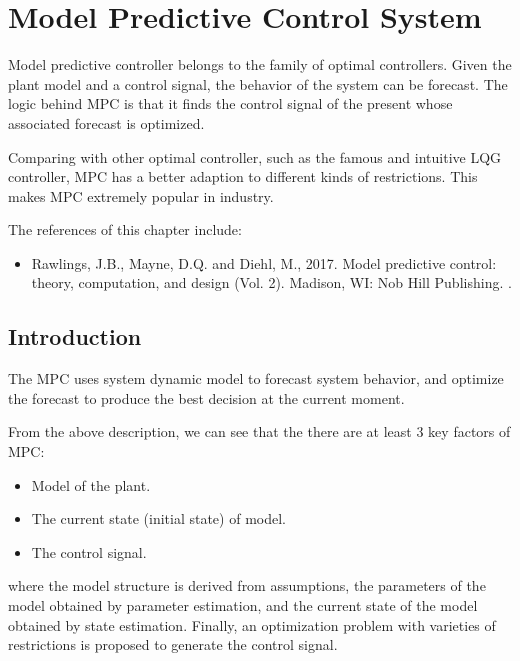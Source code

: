 \chapter{Model Predictive Control System} \label{ch:mpcs}

Model predictive controller belongs to the family of optimal controllers. Given the plant model and a control signal, the behavior of the system can be forecast. The logic behind MPC is that it finds the control signal of the present whose associated forecast is optimized.

Comparing with other optimal controller, such as the famous and intuitive LQG controller, MPC has a better adaption to different kinds of restrictions. This makes MPC extremely popular in industry. 

The references of this chapter include:
\begin{itemize}
	\item Rawlings, J.B., Mayne, D.Q. and Diehl, M., 2017. Model predictive control: theory, computation, and design (Vol. 2). Madison, WI: Nob Hill Publishing. \cite{rawlings2017model}.
\end{itemize}

\section{Introduction}

The MPC uses system dynamic model to forecast system behavior, and optimize the forecast to produce the best decision at the current moment.

From the above description, we can see that the there are at least 3 key factors of MPC:
\begin{itemize}
	\item Model of the plant.
	\item The current state (initial state) of model.
	\item The control signal.
\end{itemize}
where the model structure is derived from assumptions, the parameters of the model obtained by parameter estimation, and the current state of the model obtained by state estimation. Finally, an optimization problem with varieties of restrictions is proposed to generate the control signal.


